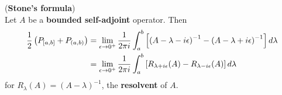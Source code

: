 \documentclass[11pt]{article}
\begin{document}
\begin{itemize}
\begin{theorem} (\textbf{Stone's formula}) \citep{reed1980methods}\\
 Let $A$ be a \textbf{bounded self-adjoint} operator. Then 
 \begin{align}
 \frac{1}{2}\left(P_{[a, b]} + P_{(a,b)}\right) &= \lim\limits_{\epsilon \rightarrow 0^{+}}\frac{1}{2\pi i} \int_{a}^{b}\left[\left(A- \lambda - i \epsilon\right)^{-1} - \left(A - \lambda + i\epsilon\right)^{-1}\right] d\lambda \label{eqn: stone_formula} \\
 &=  \lim\limits_{\epsilon \rightarrow 0^{+}}\frac{1}{2\pi i} \int_{a}^{b}\left[R_{\lambda + i \epsilon}(A) - R_{\lambda - i \epsilon}(A)\right] d\lambda \nonumber
 \end{align} for $R_{\lambda}(A) = (A - \lambda)^{-1}$, the \textbf{resolvent} of $A$.
\end{theorem}
\end{itemize}

\newpage


\end{document}
